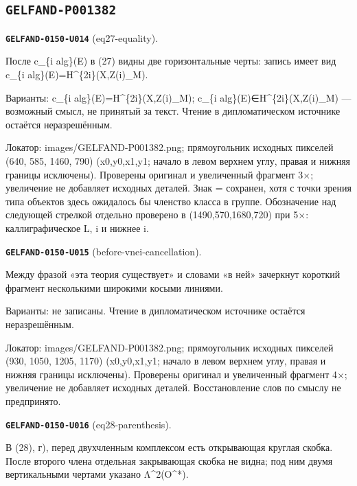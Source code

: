 \documentclass[11pt]{article}
\theoremstyle{definition}
\theoremstyle{remark}
\begin{document}
\subsection*{\texttt{GELFAND-P001382}}
\noindent\leavevmode{}\label{GELFAND-P001382:eq27-equality:note}\textbf{\texttt{GELFAND-0150-U014}} (eq27-equality).\par\nopagebreak[4]
После c\_\{i alg\}(E) в (27) видны две горизонтальные черты: запись имеет вид c\_\{i alg\}(E)=H\textasciicircum{}\{2i\}(X,Z(i)\_M).\par
Варианты: c\_\{i alg\}(E)=H\textasciicircum{}\{2i\}(X,Z(i)\_M); c\_\{i alg\}(E)∈H\textasciicircum{}\{2i\}(X,Z(i)\_M) — возможный смысл, не принятый за текст. Чтение в дипломатическом источнике остаётся неразрешённым.\par
Локатор: images/GELFAND-P001382.png; прямоугольник исходных пикселей (640, 585, 1460, 790) (x0,y0,x1,y1; начало в левом верхнем углу, правая и нижняя границы исключены). Проверены оригинал и увеличенный фрагмент 3×; увеличение не добавляет исходных деталей. Знак = сохранен, хотя с точки зрения типа объектов здесь ожидалось бы членство класса в группе. Обозначение над следующей стрелкой отдельно проверено в (1490,570,1680,720) при 5×: каллиграфическое L, i и нижнее i.\par\medskip
\noindent\leavevmode{}\label{GELFAND-P001382:before-vnei-cancellation:note}\textbf{\texttt{GELFAND-0150-U015}} (before-vnei-cancellation).\par\nopagebreak[4]
Между фразой «эта теория существует» и словами «в ней» зачеркнут короткий фрагмент несколькими широкими косыми линиями.\par
Варианты: не записаны. Чтение в дипломатическом источнике остаётся неразрешённым.\par
Локатор: images/GELFAND-P001382.png; прямоугольник исходных пикселей (930, 1050, 1205, 1170) (x0,y0,x1,y1; начало в левом верхнем углу, правая и нижняя границы исключены). Проверены оригинал и увеличенный фрагмент 4×; увеличение не добавляет исходных деталей. Восстановление слов по смыслу не предпринято.\par\medskip
\noindent\leavevmode{}\label{GELFAND-P001382:eq28-parenthesis:note}\textbf{\texttt{GELFAND-0150-U016}} (eq28-parenthesis).\par\nopagebreak[4]
В (28), г), перед двухчленным комплексом есть открывающая круглая скобка. После второго члена отдельная закрывающая скобка не видна; под ним двумя вертикальными чертами указано Λ\textasciicircum{}2(O\textasciicircum{}*).\par
\end{document}
